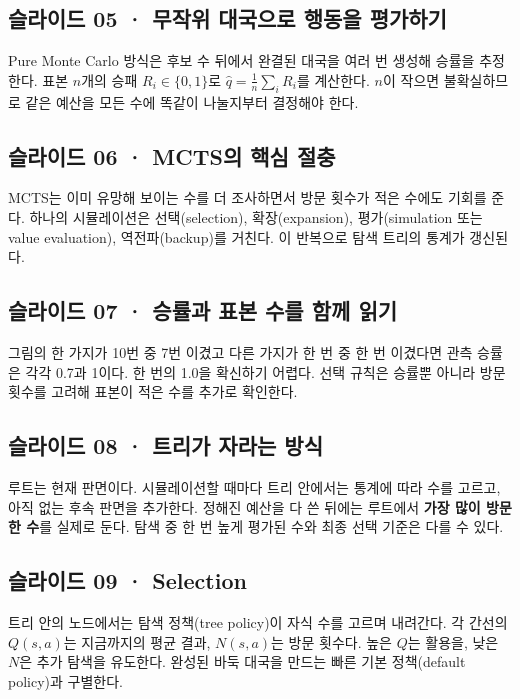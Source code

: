 \documentclass[11pt,a4paper]{article}
\begin{document}
\subsection{슬라이드 05 · 무작위 대국으로 행동을 평가하기}

Pure Monte Carlo 방식은 후보 수 뒤에서 완결된 대국을 여러 번 생성해 승률을 추정한다. 표본 $n$개의 승패 $R_i\in\{0,1\}$로 $\hat q=\frac1n\sum_iR_i$를 계산한다. $n$이 작으면 불확실하므로 같은 예산을 모든 수에 똑같이 나눌지부터 결정해야 한다.\par

\subsection{슬라이드 06 · MCTS의 핵심 절충}

MCTS는 이미 유망해 보이는 수를 더 조사하면서 방문 횟수가 적은 수에도 기회를 준다. 하나의 시뮬레이션은 선택(selection), 확장(expansion), 평가(simulation 또는 value evaluation), 역전파(backup)를 거친다. 이 반복으로 탐색 트리의 통계가 갱신된다.\par

\subsection{슬라이드 07 · 승률과 표본 수를 함께 읽기}

그림의 한 가지가 10번 중 7번 이겼고 다른 가지가 한 번 중 한 번 이겼다면 관측 승률은 각각 0.7과 1이다. 한 번의 1.0을 확신하기 어렵다. 선택 규칙은 승률뿐 아니라 방문 횟수를 고려해 표본이 적은 수를 추가로 확인한다.\par

\subsection{슬라이드 08 · 트리가 자라는 방식}

루트는 현재 판면이다. 시뮬레이션할 때마다 트리 안에서는 통계에 따라 수를 고르고, 아직 없는 후속 판면을 추가한다. 정해진 예산을 다 쓴 뒤에는 루트에서 \textbf{가장 많이 방문한 수}를 실제로 둔다. 탐색 중 한 번 높게 평가된 수와 최종 선택 기준은 다를 수 있다.\par

\subsection{슬라이드 09 · Selection}

트리 안의 노드에서는 탐색 정책(tree policy)이 자식 수를 고르며 내려간다. 각 간선의 $Q(s,a)$는 지금까지의 평균 결과, $N(s,a)$는 방문 횟수다. 높은 $Q$는 활용을, 낮은 $N$은 추가 탐색을 유도한다. 완성된 바둑 대국을 만드는 빠른 기본 정책(default policy)과 구별한다.\par
\end{document}
